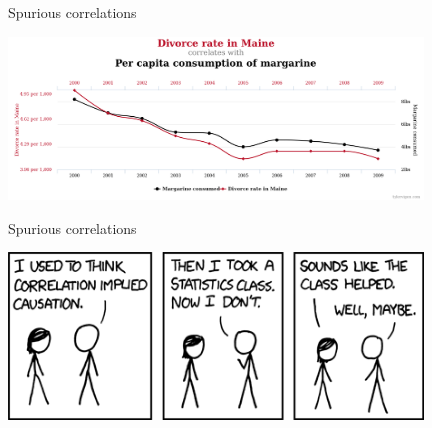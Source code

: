 \documentclass{beamer}
\begin{document}
\begin{frame}
{\centerline{Spurious correlations}}

\begin{center}
\includegraphics[width=11cm]{P2023.AIBCCSS.InferenceAndLogisticRegression/chart-2.png}
\end{center}


\end{frame}



\begin{frame}
{\centerline{Spurious correlations}}

\begin{center}
\includegraphics[width=11cm]{P2023.AIBCCSS.InferenceAndLogisticRegression/comics.png}
\end{center}


\end{frame}
\end{document}
